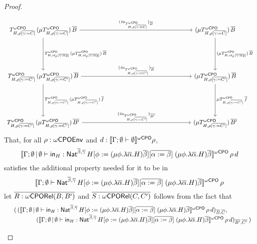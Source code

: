 \documentclass[acmsmall,review,anonymous]{acmart}
\theoremstyle{definition}
\renewcommand{\id}{\mathit{id}}
\begin{document}
\begin{proof}
\begin{itemize}
{\[\begin{tikzcd}[column sep=2.5in, row sep=0.75in]
T^\oCPO_{H,\rho[\ol{\gamma := C}]}\, (\mu T^\oCPO_{H,\rho[\ol{\gamma := C}]})\, \ol{B}
\ar[d, "{T^\oCPO_{H,\id_\rho[\ol{\gamma := g}]}\,(\mu
    T^\oCPO_{H,\id_\rho[\ol{\gamma := g}]}) \, \ol{B}}"] \ar[r,
  "{(\mathit{in}_{T^\oCPO_{H,\rho[\ol{\gamma := C}]}})_{\ol{B}}}" ]
& (\mu T^\oCPO_{H,\rho[\ol{\gamma := C}]})\, \ol{B} \ar[d, "{(\mu
    T^\oCPO_{H,\id_\rho[\ol{\gamma := g}]}) \, \ol{B}}"]\\
T^\oCPO_{H,\rho[\ol{\gamma := C'}]}\, (\mu
T^\oCPO_{H,\rho[\ol{\gamma := C'}]})\, \ol{B} \ar[d, "{T^\oCPO_{H,\rho[\ol{\gamma :=
          C'}]}\, (\mu T^\oCPO_{H,\rho[\ol{\gamma := C'}]})\, \ol{f}}"]
\ar[r,"{(\mathit{in}_{T^\oCPO_{H,\rho[\ol{\gamma := C'}]}})_{\ol{B}}}" ] & 
  (\mu T^\oCPO_{H,\rho[\ol{\gamma := C'}]})\, \ol{B}
\ar[d,"{\mu {T^\oCPO_{H,\rho[\ol{\gamma := C'}]}}\, {\ol{f}}}" ] 
\\
T^\oCPO_{H,\rho[\ol{\gamma := C'}]}\, (\mu T^\oCPO_{H,\rho[\ol{\gamma := C'}]})\,
\ol{B'} \ar[r, "{(\mathit{in}_{T^\oCPO_{H,\rho[\ol{\gamma :=
            C'}]}})_{\ol{B'}}}"] & (\mu T^\oCPO_{H,\rho[\ol{\gamma := C'}]})\,
\ol{B'}
\end{tikzcd}\]
}
  That, for all $\rho : \omega\mathsf{CPOEnv}$ and $d :
\llbracket{\Gamma;\emptyset \vdash \emptyset}\rrbracket^{{\omega\mathsf{CPO}}}\rho$,
\[\llbracket{\Gamma;\emptyset \,|\, \emptyset \vdash
  \mathsf{in}_H : \mathsf{Nat}^{\overline{\beta},\overline{\gamma}} \, H[\phi := (\mu \phi.\lambda
    {\overline \alpha}.H){\overline \beta}][\overline{\alpha := \beta}]
  \;(\mu \phi.\lambda {\overline \alpha}.H){\overline
    \beta}}\rrbracket^{{\omega\mathsf{CPO}}}\,\rho\,d\] satisfies the additional property needed for
it to be in \[\llbracket{\Gamma;\emptyset \vdash
  \mathsf{Nat}^{\overline{\beta},\overline{\gamma}} \, H[\phi := (\mu \phi.\lambda
    {\overline \alpha}.H){\overline \beta}][\overline{\alpha := \beta}]
  \;(\mu \phi.\lambda {\overline \alpha}.H){\overline \beta}}\rrbracket^{{\omega\mathsf{CPO}}}\,\rho\]
  let $\overline{R : {\omega\mathsf{CPORel}}(B,B')}$ and $\overline{S : {\omega\mathsf{CPORel}}(C,C')}$ follows from the
  fact that 
\[\begin{array}{ll}
 & (\,(\llbracket{\Gamma;\emptyset \,|\, \emptyset \vdash
  \mathsf{in}_H : \mathsf{Nat}^{\overline{\beta},\overline{\gamma}} \, H[\phi := (\mu \phi.\lambda
    {\overline \alpha}.H){\overline \beta}][\overline{\alpha := \beta}]
  \;(\mu \phi.\lambda {\overline \alpha}.H){\overline
    \beta}}\rrbracket^{{\omega\mathsf{CPO}}}\,\rho\,d)_{\overline{B},\overline{C}},\,\\
 & \hspace*{0.5in}(\llbracket{\Gamma;\emptyset \,|\, \emptyset \vdash
  \mathsf{in}_H : \mathsf{Nat}^{\overline{\beta},\overline{\gamma}} \, H[\phi := (\mu \phi.\lambda
    {\overline \alpha}.H){\overline \beta}][\overline{\alpha := \beta}]
  \;(\mu \phi.\lambda {\overline \alpha}.H){\overline
    \beta}}\rrbracket^{{\omega\mathsf{CPO}}}\,\rho\,d)_{\overline{B'},\overline{C'}}\,)\\

\end{array}\]
\end{itemize}
\end{proof}
\end{document}
